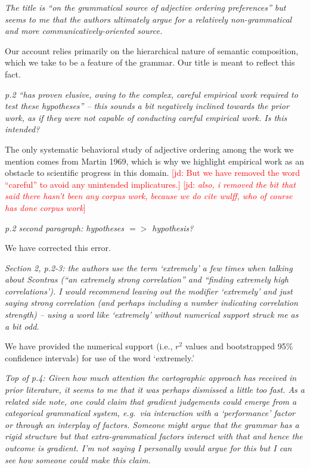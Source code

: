 \documentclass[12pt]{article}
\newcommand{\jd}[1]{\textcolor{red}{[jd: #1]}}
\begin{document}
\item \emph{The title is ``on the grammatical source of adjective ordering
preferences'' but seems to me that the authors ultimately argue for a
relatively non-grammatical and more communicatively-oriented source.}

Our account relies primarily on the hierarchical nature of semantic composition, which we take to be a feature of the grammar. Our title is meant to reflect this fact.

\item \emph{p.2 ``has proven elusive, owing to the complex, careful empirical work
required to test these hypotheses'' – this sounds a bit negatively
inclined towards the prior work, as if they were not capable of conducting
careful empirical work. Is this intended?}

The only systematic behavioral study of adjective ordering among the work we mention comes from Martin 1969, which is why we highlight empirical work as an obstacle to scientific progress in this domain. \jd{But we have removed the word ``careful'' to avoid any unintended implicatures.} \jd{\emph{also, i removed the bit that said there hasn't been any corpus work, because we do cite wulff, who of course has done corpus work}}

\item \emph{p.2 second paragraph: hypotheses $=>$ hypothesis?}

We have corrected this error.

\item \emph{Section 2, p.2-3: the authors use the term `extremely' a few times when talking about Scontras (``an extremely strong correlation'' and ``finding
extremely high correlations').  I would recommend leaving out the modifier
`extremely' and just saying strong correlation (and perhaps including a
number indicating correlation strength) – using a word like
`extremely' without numerical support struck me as a bit odd.}

We have provided the numerical support (i.e., $r^2$ values and bootstrapped 95\% confidence intervals) for use of the word `extremely.'

\item \emph{Top of p.4: Given how much attention the cartographic approach has received in prior literature, it seems to me that it was perhaps dismissed a little too fast. As a related side note, one could claim that gradient judgements
could emerge from a categorical grammatical system, e.g.~via interaction with
a `performance' factor or through an interplay of factors. Someone might
argue that the grammar has a rigid structure but that extra-grammatical
factors interact with that and hence the outcome is gradient. I'm not
saying I personally would argue for this but I can see how someone could
make this claim.}
\end{document}
